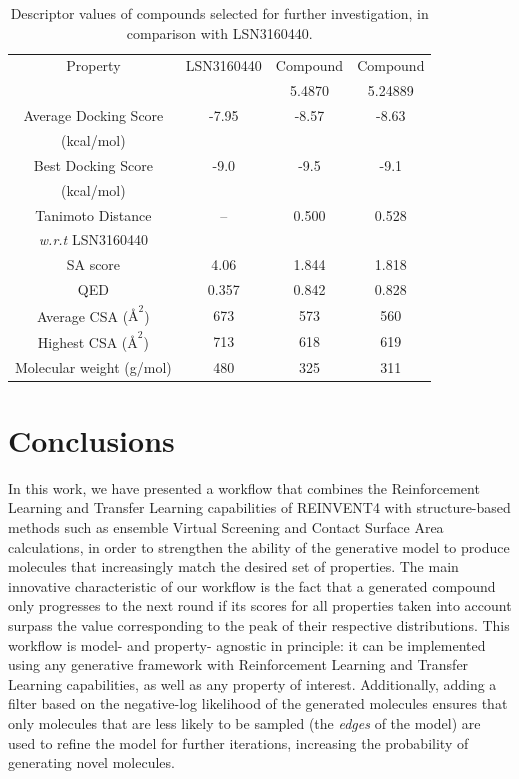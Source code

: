 \documentclass[letterpaper]{article}
\begin{document}
\begin{table}[H]
  \caption{Descriptor values of compounds selected for further investigation, in comparison with LSN3160440.}
  \label{tab:new_molecules}
  \centering
  \begin{tabular}{cccc}
    \hline
    Property & LSN3160440 & Compound & Compound \\
             &     & 5.4870   & 5.24889 \\
    \hline
    Average Docking Score & -7.95 & -8.57 & -8.63\\
    (kcal/mol) & & & \\
    Best Docking Score & -9.0 & -9.5 & -9.1\\
    (kcal/mol) & & & \\
    Tanimoto Distance & -- & 0.500 & 0.528\\
    \textit{w.r.t} LSN3160440 & & & \\
    SA score & 4.06 & 1.844 & 1.818\\
    QED & 0.357 & 0.842 & 0.828\\
    Average CSA ($\text{\AA}^{2}$) & 673 & 573 & 560\\
    Highest CSA ($\text{\AA}^{2}$) & 713 & 618 & 619\\
    Molecular weight (g/mol) & 480 & 325 & 311\\
    \hline
  \end{tabular}
\end{table}

\section*{Conclusions}
In this work, we have presented a workflow that combines the Reinforcement Learning and Transfer Learning capabilities of REINVENT4 with structure-based methods such as ensemble Virtual Screening and Contact Surface Area calculations, in order to strengthen the ability of the generative model to produce molecules that increasingly match the desired set of properties. The main innovative characteristic of our workflow is the fact that a generated compound only progresses to the next round if its scores for all properties taken into account surpass the value corresponding to the peak of their respective distributions. This workflow is model- and property- agnostic in principle: it can be implemented using any generative framework with Reinforcement Learning and Transfer Learning capabilities, as well as any property of interest. Additionally, adding a filter based on the negative-log likelihood of the generated molecules ensures that only molecules that are less likely to be sampled (the \textit{edges} of the model) are used to refine the model for further iterations, increasing the probability of generating novel molecules.
\end{document}

